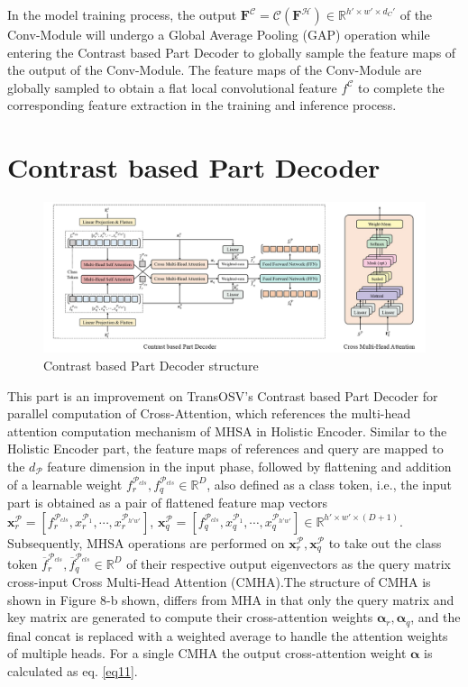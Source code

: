 In the model training process, the output $\mathbf{F}^\mathcal{C} = \mathcal{C}(\mathbf{F}^\mathcal{H} ) \in \mathbb{R}^{h'\times w'\times d_C' }$ of the Conv-Module will undergo a Global Average Pooling (GAP) operation while entering the Contrast based Part Decoder to globally sample the feature maps of the output of the Conv-Module. The feature maps of the Conv-Module are globally sampled to obtain a flat local convolutional feature $f^\mathcal{C}$ to complete the corresponding feature extraction in the training and inference process.

\section{Contrast based Part Decoder}

\begin{figure}[H]
  \centering
      \includegraphics[scale=0.45]{figure/decoder.png}
  \caption{Contrast based Part Decoder structure}
  \label{fig:decoder}
\end{figure}

This part is an improvement on TransOSV's Contrast based Part Decoder \cite{41} for parallel computation of Cross-Attention, which references the multi-head attention computation mechanism of MHSA in Holistic Encoder. Similar to the Holistic Encoder part, the feature maps of references and query are mapped to the $d_\mathcal{P}$ feature dimension in the input phase, followed by flattening and addition of a learnable weight $f_r^{\mathcal{P}_{cls}},f_q^{\mathcal{P}_{cls}} \in \mathbb{R}^D$, also defined as a class token, i.e., the input part is obtained as a pair of flattened feature map vectors $\boldsymbol{x}_r^\mathcal{P} = [f_r^{\mathcal{P}_{cls}}, x_r^{\mathcal{P}_1},\cdots ,x_r^{\mathcal{P}_{h' w' }} ]$, $\boldsymbol{x}_q^\mathcal{P}=[f_q^{\mathcal{P}_{cls}},x_q^{\mathcal{P}_1},\cdots,x_q^{\mathcal{P}_{h'w'} } ] \in \mathbb{R}^{h' \times w' \times (D+1)}$. Subsequently, MHSA operations are performed on $\boldsymbol{x}_r^\mathcal{P},\boldsymbol{x}_q^\mathcal{P}$ to take out the class token $\overline{f}_r^{\mathcal{P}_{cls}},\overline{f}_q^{\mathcal{P}_{cls}} \in \mathbb{R}^D$ of their respective output eigenvectors as the query matrix cross-input Cross Multi-Head Attention (CMHA).The structure of CMHA is shown in Figure 8-b shown, differs from MHA in that only the query matrix and key matrix are generated to compute their cross-attention weights $\boldsymbol{\alpha}_r,\boldsymbol{\alpha}_q$, and the final concat is replaced with a weighted average to handle the attention weights of multiple heads. For a single CMHA the output cross-attention weight $\boldsymbol{\alpha}$ is calculated as eq. \ref{eq11}.

